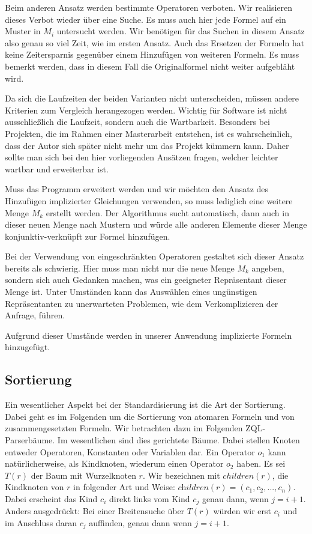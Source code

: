 Beim anderen Ansatz werden bestimmte Operatoren verboten. Wir realisieren dieses Verbot wieder über eine Suche. Es muss auch hier jede Formel auf ein Muster in $M_i$ untersucht werden. Wir benötigen für das Suchen in diesem Ansatz also genau so viel Zeit, wie im ersten Ansatz. Auch das Ersetzen der Formeln hat keine Zeitersparnis gegenüber einem Hinzufügen von weiteren Formeln. Es muss bemerkt werden, dass in diesem Fall die Originalformel nicht weiter aufgebläht wird.

Da sich die Laufzeiten der beiden Varianten nicht unterscheiden, müssen andere Kriterien zum Vergleich herangezogen werden. Wichtig für Software ist nicht ausschließlich die Laufzeit, sondern auch die Wartbarkeit. Besonders bei Projekten, die im Rahmen einer Masterarbeit entstehen, ist es wahrscheinlich, dass der Autor sich später nicht mehr um das Projekt kümmern kann. Daher sollte man sich bei den hier vorliegenden Ansätzen fragen, welcher leichter wartbar und erweiterbar ist.

Muss das Programm erweitert werden und wir möchten den Ansatz des Hinzufügen implizierter Gleichungen verwenden, so muss lediglich eine weitere Menge $M_k$ erstellt werden. Der Algorithmus sucht automatisch, dann auch in dieser neuen Menge nach Mustern und würde alle anderen Elemente dieser Menge konjunktiv-verknüpft zur Formel hinzufügen. 

Bei der Verwendung von eingeschränkten Operatoren gestaltet sich dieser Ansatz bereits als schwierig. Hier muss man nicht nur die neue Menge $M_k$ angeben, sondern sich auch Gedanken machen, was ein geeigneter Repräsentant dieser Menge ist. Unter Umständen kann das Auswählen eines ungünstigen Repräsentanten zu unerwarteten Problemen, wie dem Verkomplizieren der Anfrage, führen.

Aufgrund dieser Umstände werden in unserer Anwendung implizierte Formeln hinzugefügt.

\subsection{Sortierung}
\label{subsec:sort}

Ein wesentlicher Aspekt bei der Standardisierung ist die Art der Sortierung. Dabei geht es im Folgenden um die Sortierung von atomaren Formeln und von zusammengesetzten Formeln. Wir betrachten dazu im Folgenden ZQL-Parserbäume. Im wesentlichen sind dies gerichtete Bäume. Dabei stellen Knoten entweder Operatoren, Konstanten oder Variablen dar. Ein Operator $o_1$ kann natürlicherweise, als Kindknoten, wiederum einen Operator $o_2$ haben. Es sei $T(r)$ der Baum mit Wurzelknoten $r$. Wir bezeichnen mit $\mathit{children}(r)$, die Kindknoten von $r$ in folgender Art und Weise: $\textit{children}(r) = (c_1, c_2, ..., c_n)$. Dabei erscheint das Kind $c_i$ direkt links vom Kind $c_j$ genau dann, wenn $j = i + 1$. Anders ausgedrückt: Bei einer Breitensuche über $T(r)$ würden wir erst $c_i$ und im Anschluss daran $c_j$ auffinden, genau dann wenn $j = i + 1$.

